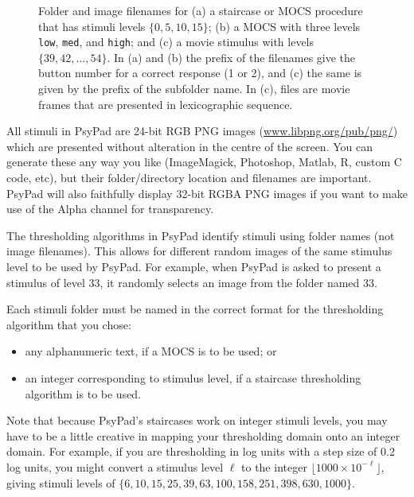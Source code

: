 \documentclass{article}
\begin{document}
\begin{figure}
\begin{center}
\caption{\label{fig-egImages}Folder and image filenames for (a) a staircase or MOCS 
procedure that has stimuli levels 
$\{0,5,10,15\}$; (b) a MOCS with three levels {\tt low}, {\tt med}, and {\tt high}; and 
(c) a movie stimulus with levels $\{39,42,\ldots,54\}$.
In (a) and (b) the prefix of the filenames give the button number for a correct response (1 or 2), and
(c) the same is given by the prefix of the subfolder name.
In (c), files are movie frames that are presented in lexicographic sequence.
}
\end{center}
\end{figure}



All stimuli in PsyPad are 24-bit RGB PNG images 
(\url{www.libpng.org/pub/png/}) which
are presented without alteration in the centre of the screen.
You can generate these any way you
like (ImageMagick, Photoshop, Matlab, R, custom C code, etc), but 
their folder/directory location and filenames are
important.
PsyPad will also faithfully display 32-bit RGBA PNG images if
you want to make use of the Alpha channel for transparency.

The thresholding algorithms in PsyPad identify stimuli using folder
names (not image filenames).  This allows for different random
images of the same stimulus level to be used by PsyPad.
For example, when PsyPad is asked to present a stimulus
of level 33, it randomly selects an image from the folder named 33.

Each stimuli folder must be named in
the correct format for the thresholding algorithm that you chose:
\begin{itemize}
    \item any alphanumeric text, if a MOCS is to be used; or
    \item an integer corresponding to stimulus level, if a staircase thresholding algorithm is to be used.
\end{itemize}

Note that because PsyPad's staircases work on integer stimuli levels, you may have to
be a little creative in mapping your thresholding domain onto an integer
domain. For example, if you are thresholding in log units with a
step size of 0.2 log units, you might convert a stimulus level $\ell$ to
the integer $\lfloor 1000\times 10^{-\ell} \rfloor$, giving stimuli levels
of 
$\{6,10,15,25,39,63,100,158,251,398,630,1000\}$.
\end{document}
